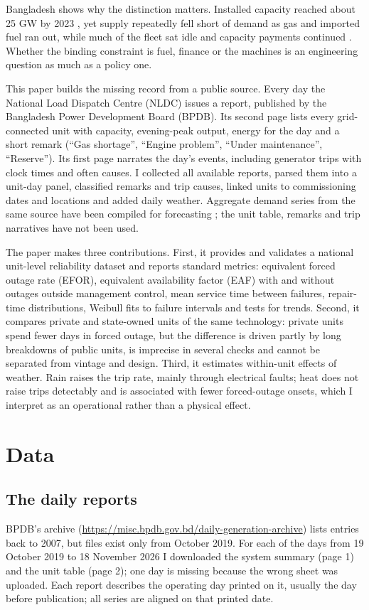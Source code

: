 \documentclass[11pt]{article}
\begin{document}
Bangladesh shows why the distinction matters. Installed capacity reached about 25 GW by 2023 \citep{bpdb2023annual}, yet supply repeatedly fell short of demand as gas and imported fuel ran out, while much of the fleet sat idle and capacity payments continued \citep{ieefa2024fixing}. Whether the binding constraint is fuel, finance or the machines is an engineering question as much as a policy one.

This paper builds the missing record from a public source. Every day the National Load Dispatch Centre (NLDC) issues a report, published by the Bangladesh Power Development Board (BPDB). Its second page lists every grid-connected unit with capacity, evening-peak output, energy for the day and a short remark (``Gas shortage'', ``Engine problem'', ``Under maintenance'', ``Reserve''). Its first page narrates the day's events, including generator trips with clock times and often causes. I collected all \nDays{} available reports, parsed them into a unit-day panel, classified remarks and trip causes, linked units to commissioning dates and locations and added daily weather. Aggregate demand series from the same source have been compiled for forecasting \citep{hossain2025dataset}; the unit table, remarks and trip narratives have not been used.

The paper makes three contributions. First, it provides and validates a national unit-level reliability dataset and reports standard metrics: equivalent forced outage rate (EFOR), equivalent availability factor (EAF) with and without outages outside management control, mean service time between failures, repair-time distributions, Weibull fits to failure intervals and tests for trends. Second, it compares private and state-owned units of the same technology: private units spend fewer days in forced outage, but the difference is driven partly by long breakdowns of public units, is imprecise in several checks and cannot be separated from vintage and design. Third, it estimates within-unit effects of weather. Rain raises the trip rate, mainly through electrical faults; heat does not raise trips detectably and is associated with fewer forced-outage onsets, which I interpret as an operational rather than a physical effect.

\section{Data}

\subsection{The daily reports}
BPDB's archive (\url{https://misc.bpdb.gov.bd/daily-generation-archive}) lists entries back to 2007, but files exist only from October 2019. For each of the \nDays{} days from 19 October 2019 to 18 November 2026 I downloaded the system summary (page 1) and the unit table (page 2); one day is missing because the wrong sheet was uploaded. Each report describes the operating day printed on it, usually the day before publication; all series are aligned on that printed date.
\end{document}
